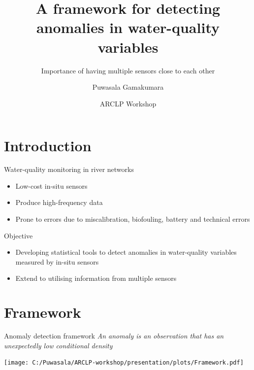 \documentclass[14pt,ignorenonframetext,compress]{beamer}
\title[]{A framework for detecting anomalies in water-quality
variables}
\subtitle{Importance of having multiple sensors close to each other}
\author[
        Puwasala Gamakumara
    ]{Puwasala Gamakumara}
\date[
      ARCLP Workshop
  ]{
      ARCLP Workshop
        }
\providecommand{\tightlist}{%
  \setlength{\itemsep}{0pt}\setlength{\parskip}{0pt}}
\begin{document}
  \begin{frame}[plain]
  \titlepage
  \end{frame}



\hypertarget{introduction}{%
\section{Introduction}\label{introduction}}

\begin{frame}{Water-quality monitoring in river networks}
\protect\hypertarget{water-quality-monitoring-in-river-networks}{}
\begin{itemize}
\item
  Low-cost in-situ sensors
\item
  Produce high-frequency data
\item
  Prone to errors due to miscalibration, biofouling, battery and
  technical errors
\end{itemize}

\begin{block}{Objective}
\protect\hypertarget{objective}{}
\begin{itemize}
\tightlist
\item
  Developing statistical tools to detect anomalies in water-quality
  variables measured by in-situ sensors
\item
  Extend to utilising information from multiple sensors
\end{itemize}
\end{block}
\end{frame}

\hypertarget{framework}{%
\section{Framework}\label{framework}}

\begin{frame}{Anomaly detection framework}
\protect\hypertarget{anomaly-detection-framework}{}
\emph{An anomaly is an observation that has an unexpectedly low
conditional density}

\texttt{[image: C:/Puwasala/ARCLP-workshop/presentation/plots/Framework.pdf]}
\end{frame}
\end{document}
